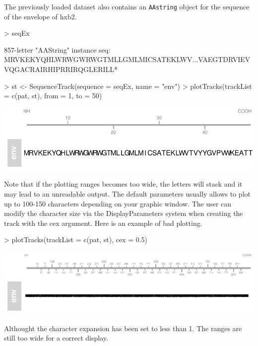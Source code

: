 \documentclass[11pt]{article}
\begin{document}
The previously loaded dataset also contains an \texttt{AAstring} object for the
sequence of the envelope of hxb2.
\begin{Schunk}
\begin{Sinput}
> seqEx
\end{Sinput}
\begin{Soutput}
  857-letter "AAString" instance
seq: MRVKEKYQHLWRWGWRWGTMLLGMLMICSATEKLWV...VAEGTDRVIEVVQGACRAIRHIPRRIRQGLERILL*
\end{Soutput}
\begin{Sinput}
> st <- SequenceTrack(sequence = seqEx, name = "env")
> plotTracks(trackList = c(pat, st), from = 1, to = 50)
\end{Sinput}
\end{Schunk}
\includegraphics{Pviz-SequenceTrack-basic}

Note that if the plotting ranges becomes too wide, the letters will stack and it
may lead to an unreadable output. The default parameters usually allows to plot
up to 100-150 characters depending on your graphic window. The user can modify
the character size via the DisplayParameters system when creating the track
with the cex argument.
Here is an example of bad plotting.
\begin{Schunk}
\begin{Sinput}
> plotTracks(trackList = c(pat, st), cex = 0.5)
\end{Sinput}
\end{Schunk}
\includegraphics{Pviz-SequenceTrack-unreadable}

Althought the character expansion has been set to less than 1. The ranges are
still too wide for a correct display.
\end{document}

